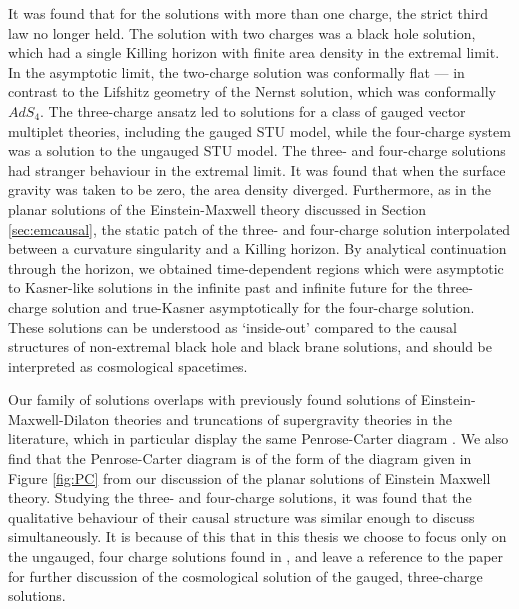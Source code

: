 It was found that for the solutions with more than one charge, the strict third law no longer held. The solution with two charges was a black hole solution, which had a single Killing horizon with finite area density in the extremal limit. In the asymptotic limit, the two-charge solution was conformally flat --- in contrast to the Lifshitz geometry of the Nernst solution, which was conformally $AdS_4$. The three-charge ansatz led to solutions for a class of gauged vector multiplet theories, including the gauged STU model, while the four-charge system was a solution to the ungauged STU model. The three- and four-charge solutions had stranger behaviour in the extremal limit. It was found that when the surface gravity was taken to be zero, the area density diverged. Furthermore, as in the planar solutions of the Einstein-Maxwell theory discussed in Section \ref{sec:emcausal}, the static patch of the three- and four-charge solution interpolated between a curvature singularity and a Killing horizon. By analytical continuation through the horizon, we obtained time-dependent regions which were asymptotic to Kasner-like solutions in the infinite past and infinite future for the three-charge solution and true-Kasner asymptotically for the four-charge solution. These solutions can be understood as `inside-out' compared to the causal structures of non-extremal black hole and black brane solutions, and should be interpreted as cosmological spacetimes. 

Our family of solutions overlaps with previously found solutions of Einstein-Maxwell-Dilaton theories and truncations of supergravity theories in the literature, which in particular display the same Penrose-Carter diagram \cite{Burgess:2002vu, Burgess:2003mk, Cornalba:2003kd}. We also find that the Penrose-Carter diagram is of the form of the diagram given in Figure \ref{fig:PC} from our discussion of the planar solutions of Einstein Maxwell theory. Studying the three- and four-charge solutions, it was found that the qualitative behaviour of their causal structure was similar enough to discuss simultaneously. It is because of this that in this thesis we choose to focus only on the ungauged, four charge solutions found in \cite{Gutowski:2019iyo}, and leave a reference to the paper for further discussion of the cosmological solution of the gauged, three-charge solutions. 

